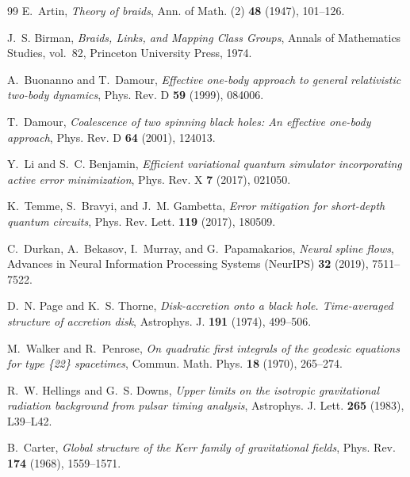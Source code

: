 \documentclass[11pt,a4paper,reqno]{article}
\theoremstyle{plain}
\theoremstyle{definition}
\theoremstyle{remark}
\numberwithin{equation}{section}
\begin{document}
\begin{thebibliography}{99}
E.~Artin, \emph{Theory of braids}, Ann. of Math. (2) \textbf{48} (1947), 101--126.

J.~S. Birman, \emph{Braids, Links, and Mapping Class Groups}, Annals of Mathematics Studies, vol.~82, Princeton University Press, 1974.

A.~Buonanno and T.~Damour, \emph{Effective one-body approach to general relativistic two-body dynamics}, Phys. Rev. D \textbf{59} (1999), 084006.

T.~Damour, \emph{Coalescence of two spinning black holes: An effective one-body approach}, Phys. Rev. D \textbf{64} (2001), 124013.

Y.~Li and S.~C. Benjamin, \emph{Efficient variational quantum simulator incorporating active error minimization}, Phys. Rev. X \textbf{7} (2017), 021050.

K.~Temme, S.~Bravyi, and J.~M. Gambetta, \emph{Error mitigation for short-depth quantum circuits}, Phys. Rev. Lett. \textbf{119} (2017), 180509.

C.~Durkan, A.~Bekasov, I.~Murray, and G.~Papamakarios, \emph{Neural spline flows}, Advances in Neural Information Processing Systems (NeurIPS) \textbf{32} (2019), 7511--7522.

D.~N. Page and K.~S. Thorne, \emph{Disk-accretion onto a black hole. Time-averaged structure of accretion disk}, Astrophys. J. \textbf{191} (1974), 499--506.

M.~Walker and R.~Penrose, \emph{On quadratic first integrals of the geodesic equations for type \{22\} spacetimes}, Commun. Math. Phys. \textbf{18} (1970), 265--274.

R.~W. Hellings and G.~S. Downs, \emph{Upper limits on the isotropic gravitational radiation background from pulsar timing analysis}, Astrophys. J. Lett. \textbf{265} (1983), L39--L42.

B.~Carter, \emph{Global structure of the Kerr family of gravitational fields}, Phys. Rev. \textbf{174} (1968), 1559--1571.

\end{thebibliography}
\end{document}
